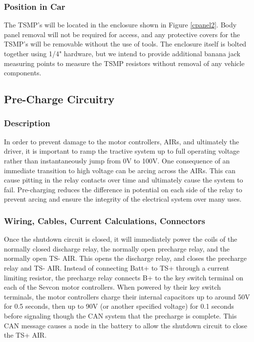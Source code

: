 \documentclass{article}
\begin{document}

        \subsubsection{Position in Car}

            The TSMP's will be located in the enclosure shown in Figure \ref{cpanel2}. Body panel removal will not be required for access, and any protective covers for the TSMP's will be removable without the use of tools. The enclosure itself is bolted together using 1/4" hardware, but we intend to provide additional banana jack measuring points to measure the TSMP resistors without removal of any vehicle components.

    \subsection{Pre-Charge Circuitry}

        \subsubsection{Description}
        
            In order to prevent damage to the motor controllers, AIRs, and ultimately the driver, it is important to ramp the tractive system up to full operating voltage rather than instantaneously jump from 0V to 100V. One consequence of an immediate transition to high voltage can be arcing across the AIRs. This can cause pitting in the relay contacts over time and ultimately cause the system to fail. Pre-charging reduces the difference in potential on each side of the relay to prevent arcing and ensure the integrity of the electrical system over many uses.

        \subsubsection{Wiring, Cables, Current Calculations, Connectors}
        
            Once the shutdown circuit is closed, it will immediately power the coils of the normally closed discharge relay, the normally open precharge relay, and the normally open TS- AIR. This opens the discharge relay, and closes the precharge relay and TS- AIR. Instead of connecting Batt+ to TS+ through a current limiting resistor, the precharge relay connects B+ to the key switch terminal on each of the Sevcon motor controllers. When powered by their key switch terminals, the motor controllers charge their internal capacitors up to around 50V for 0.5 seconds, then up to 90V (or another specified voltage) for 0.1 seconds before signaling though the CAN system that the precharge is complete. This CAN message causes a node in the battery to allow the shutdown circuit to close the TS+ AIR.         
        
\end{document}
